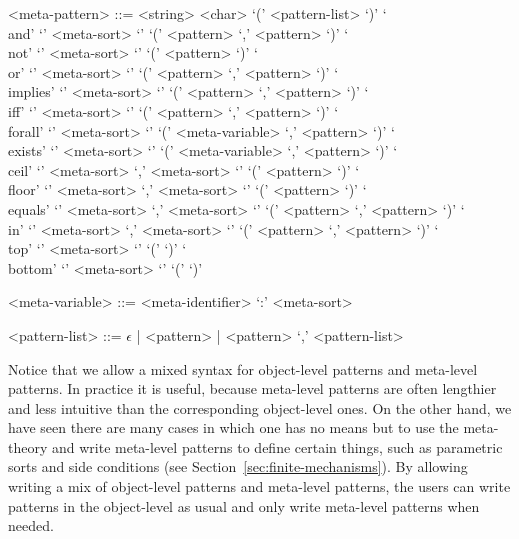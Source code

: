\documentclass[UTF8,11pt]{article}
\theoremstyle{plain}
\theoremstyle{definition}
\theoremstyle{remark}
\DeclarePairedDelimiter{\ceil}{\lceil}{\rceil}
\DeclarePairedDelimiter{\floor}{\lfloor}{\rfloor}
\begin{document}
\begin{grammar}
	<meta-pattern> ::= \quad
    \alt <string>
    \alt <char>
	\alt <meta-head> `(' <pattern-list> `)'
	\alt `\\and' `{' <meta-sort> `}'
	`(' <pattern> `,' <pattern> `)'
	\alt `\\not' `{' <meta-sort> `}'
	`(' <pattern> `)'
	\alt `\\or' `{' <meta-sort> `}'
	`(' <pattern> `,' <pattern> `)'
	\alt `\\implies' `{' <meta-sort> `}'
	`(' <pattern> `,' <pattern> `)'
	\alt `\\iff' `{' <meta-sort> `}'
	`(' <pattern> `,' <pattern> `)'
	\alt `\\forall' `{' <meta-sort> `}'
	`(' <meta-variable> `,' <pattern> `)'
	\alt `\\exists' `{' <meta-sort> `}'
	`(' <meta-variable> `,' <pattern> `)'
	\alt `\\ceil' `{' <meta-sort> `,' <meta-sort> `}'
	`(' <pattern> `)'
	\alt `\\floor' `{' <meta-sort> `,' <meta-sort> `}'
	`(' <pattern> `)'
	\alt `\\equals' `{' <meta-sort> `,' <meta-sort> `}'
	`(' <pattern> `,' <pattern> `)'
	\alt `\\in' `{' <meta-sort> `,' <meta-sort> `}'
	`(' <pattern> `,' <pattern> `)'
	\alt `\\top' `{' <meta-sort> `}' `(' `)'
	\alt `\\bottom' `{' <meta-sort> `}' `(' `)'
	
	<meta-variable> ::= <meta-identifier> `:' <meta-sort>
	
	<pattern-list> ::= $\epsilon$ | <pattern> | <pattern> `,' <pattern-list>
\end{grammar}
Notice that we allow a mixed syntax for object-level patterns and meta-level 
patterns.
In practice it is useful, because meta-level patterns are often lengthier and 
less intuitive than the corresponding object-level ones.
On the other hand, we have seen there are many cases in which one has no means 
but to use the meta-theory and write meta-level patterns to define certain 
things, such as parametric sorts and side conditions (see 
Section~\ref{sec:finite-mechanisms}).
By allowing writing a mix of object-level patterns and meta-level patterns, the 
users can write patterns in the object-level as usual and only write meta-level 
patterns when needed.
\end{document}
